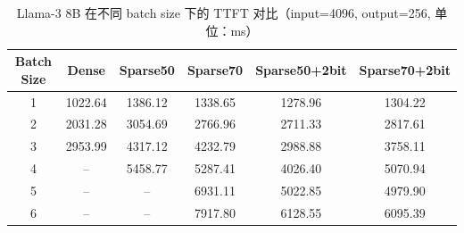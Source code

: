 \begin{table}[t]
\centering
\caption{Llama-3 8B 在不同 batch size 下的 TTFT 对比（input=4096, output=256, 单位：ms）}
\label{tab:end2end-ttft-bs}
\begin{tabular}{cccccc}
\toprule
Batch Size & Dense & Sparse50 & Sparse70 & Sparse50+2bit & Sparse70+2bit \\
\midrule
1 & 1022.64 & 1386.12 & 1338.65 & 1278.96 & 1304.22 \\
2 & 2031.28 & 3054.69 & 2766.96 & 2711.33 & 2817.61 \\
3 & 2953.99 & 4317.12 & 4232.79 & 2988.88 & 3758.11 \\
4 & -- & 5458.77 & 5287.41 & 4026.40 & 5070.94 \\
5 & -- & -- & 6931.11 & 5022.85 & 4979.90 \\
6 & -- & -- & 7917.80 & 6128.55 & 6095.39 \\
\bottomrule
\end{tabular}
\end{table}
